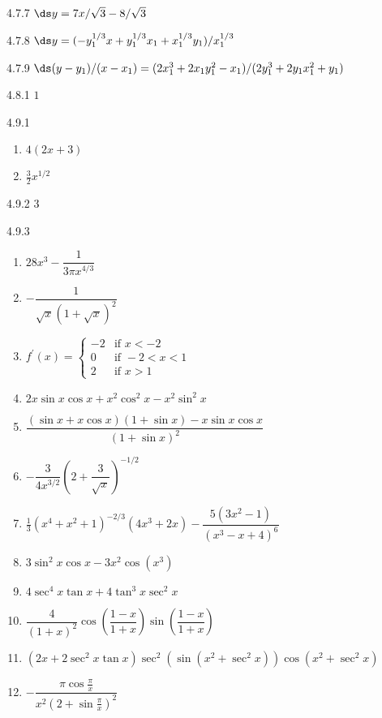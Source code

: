 \begin{Answer}{4.7.7}
	$\ds y=7x/\sqrt3-8/\sqrt3$
\end{Answer}
\begin{Answer}{4.7.8}
	$\ds y=(-y_1^{1/3}x+y_1^{1/3}x_1+x_1^{1/3}y_1)/x_1^{1/3}$
\end{Answer}
\begin{Answer}{4.7.9}
	$\ds (y-y_1)/(x-x_1)=(2x_1^3+2x_1y_1^2-x_1)/(2y_1^3+2y_1x_1^2+y_1)$
\end{Answer}
\begin{Answer}{4.8.1}
	$1$
\end{Answer}
\begin{Answer}{4.9.1}
\begin{enumerate}
	\item	$4(2x+3)$
	\item	$\frac{3}{2}x^{1/2}$
\end{enumerate}
\end{Answer}
\begin{Answer}{4.9.2}
	3
\end{Answer}
\begin{Answer}{4.9.3}
\begin{enumerate}
	\item	$28x^3-\dfrac{1}{3\pi x^{4/3}}$
	\item	$-\dfrac{1}{\sqrt{x}(1+\sqrt{x})^2}$
	\item	$f^{\prime}(x)=\left\{
	\begin{array}{ll}
	-2 & \text{if }x<-2 \\
	0 & \text{if }-2<x<1 \\
	2 & \text{if }x>1%
	\end{array}%
	\right. $
	\item	$2x\sin x\cos x+x^2\cos^2 x-x^2\sin^2 x$
	\item	$\dfrac{(\sin x+x\cos x)(1+\sin x)-x\sin x\cos x}{(1+\sin x)^2}$
	\item	$-\dfrac{3}{4x^{3/2}}\left(2+\dfrac{3}{\sqrt{x}}\right)^{-1/2}$
	\item	$\frac{1}{3}(x^4+x^2+1)^{-2/3}(4x^3+2x)-\dfrac{5(3x^2-1)}{(x^3-x+4)^6}$
	\item	$3\sin^2 x\cos x-3x^2\cos(x^3)$
	\item	$4\sec^4 x\tan x + 4\tan^3 x\sec^2 x$
	\item	$\dfrac{4}{(1+x)^2}\cos\left(\dfrac{1-x}{1+x}\right)\sin\left(\dfrac{1-x}{1+x}\right)$
	\item	$(2x+2\sec^2 x\tan x)\sec^2(\sin(x^2+\sec^2 x))\cos(x^2+\sec^2 x)$
	\item	$-\dfrac{\pi\cos\frac{\pi}{x}}{x^2(2+\sin\frac{\pi}{x})^2}$
\end{enumerate}
\end{Answer}
